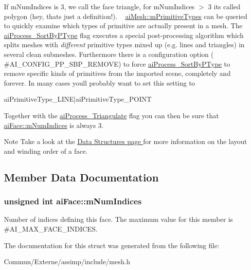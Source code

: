 If m\+Num\+Indices is 3, we call the face \textquotesingle{}triangle\textquotesingle{}, for m\+Num\+Indices $>$ 3 it\textquotesingle{}s called \textquotesingle{}polygon\textquotesingle{} (hey, that\textquotesingle{}s just a definition!). ~\newline
 \hyperlink{structai_mesh_a99d66ac0a444068c1b252b30265cbf53}{ai\+Mesh\+::m\+Primitive\+Types} can be queried to quickly examine which types of primitive are actually present in a mesh. The \hyperlink{postprocess_8h_a64795260b95f5a4b3f3dc1be4f52e410ab4484f73635d633cd79973bac1431ed6}{ai\+Process\+\_\+\+Sort\+By\+P\+Type} flag executes a special post-\/processing algorithm which splits meshes with {\itshape different} primitive types mixed up (e.\+g. lines and triangles) in several \textquotesingle{}clean\textquotesingle{} submeshes. Furthermore there is a configuration option ( \#\+A\+I\+\_\+\+C\+O\+N\+F\+I\+G\+\_\+\+P\+P\+\_\+\+S\+B\+P\+\_\+\+R\+E\+M\+O\+VE) to force \hyperlink{postprocess_8h_a64795260b95f5a4b3f3dc1be4f52e410ab4484f73635d633cd79973bac1431ed6}{ai\+Process\+\_\+\+Sort\+By\+P\+Type} to remove specific kinds of primitives from the imported scene, completely and forever. In many cases you\textquotesingle{}ll probably want to set this setting to 
\begin{DoxyCode}
aiPrimitiveType\_LINE|aiPrimitiveType\_POINT
\end{DoxyCode}
 Together with the \hyperlink{postprocess_8h_a64795260b95f5a4b3f3dc1be4f52e410a9c3de834f0307f31fa2b1b6d05dd592b}{ai\+Process\+\_\+\+Triangulate} flag you can then be sure that \hyperlink{structai_face_adda2698cec0ebfe651572f4a5701360b}{ai\+Face\+::m\+Num\+Indices} is always 3. \begin{DoxyNote}{Note}
Take a look at the \hyperlink{}{Data Structures page } for more information on the layout and winding order of a face. 
\end{DoxyNote}


\subsection{Member Data Documentation}
\subsubsection[{\texorpdfstring{m\+Num\+Indices}{mNumIndices}}]{\setlength{\rightskip}{0pt plus 5cm}unsigned int ai\+Face\+::m\+Num\+Indices}\hypertarget{structai_face_adda2698cec0ebfe651572f4a5701360b}{}\label{structai_face_adda2698cec0ebfe651572f4a5701360b}
Number of indices defining this face. The maximum value for this member is \#\+A\+I\+\_\+\+M\+A\+X\+\_\+\+F\+A\+C\+E\+\_\+\+I\+N\+D\+I\+C\+ES. 

The documentation for this struct was generated from the following file\+:\begin{DoxyCompactItemize}
\item 
Commun/\+Externe/assimp/include/mesh.\+h\end{DoxyCompactItemize}
